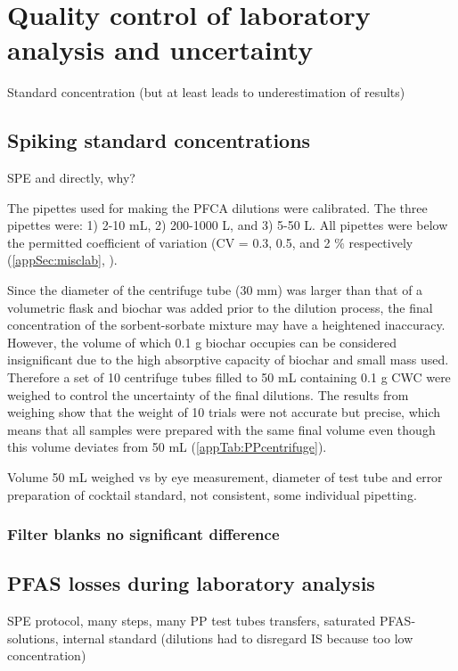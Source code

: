 \section{Quality control of laboratory analysis and uncertainty}
Standard concentration (but at least leads to underestimation of results)
\subsection{Spiking standard concentrations}
SPE and directly, why?

The pipettes used for making the PFCA dilutions were calibrated. The three pipettes were: 1) 2-10 mL, 2) 200-1000 \textmu L, and 3) 5-50 \textmu L. All pipettes were below the permitted coefficient of variation (CV = 0.3, 0.5, and 2 $\%$ respectively (\cref{appSec:misclab}, ).

Since the diameter of the centrifuge tube (30 mm) was larger than that of a volumetric flask and biochar was added prior to the dilution process, the final concentration of the sorbent-sorbate mixture may have a heightened inaccuracy. However, the volume of which 0.1 g biochar occupies can be considered insignificant due to the high absorptive capacity of biochar and small mass used. Therefore a set of 10 centrifuge tubes filled to 50 mL containing 0.1 g CWC were weighed to control the uncertainty of the final dilutions. The results from weighing show that the weight of 10 trials were not accurate but precise, which means that all samples were prepared with the same final volume even though this volume deviates from 50 mL (\cref{appTab:PPcentrifuge}). 

Volume 50 mL weighed vs by eye measurement, diameter of test tube and error
preparation of cocktail standard, not consistent, some individual pipetting. 

\subsubsection{Filter blanks no significant difference}

\subsection{PFAS losses during laboratory analysis}
SPE protocol, many steps, many PP test tubes transfers, saturated PFAS-solutions, internal standard (dilutions had to disregard IS because too low concentration)


